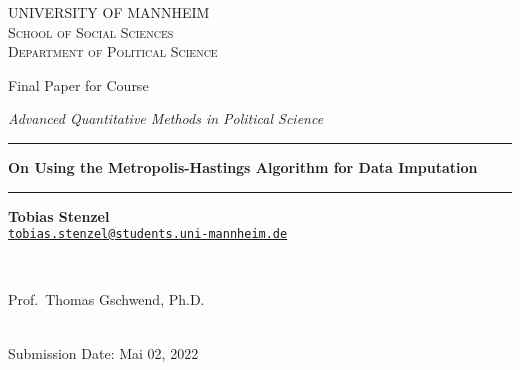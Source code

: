 \documentclass[12pt,english,a4paper,oneside]{article}
\theoremstyle{definition}
\theoremstyle{definition}
\theoremstyle{definition}
\theoremstyle{definition}
\theoremstyle{remark}
\begin{document}
\begin{titlepage}

    \begin{center}
    \large{ \textsc{ \uppercase{University of Mannheim} \\ \vspace{-0.2cm}
School of Social Sciences \\ \vspace{-0.2cm}
Department of Political Science}}

      
        \vspace{3.5cm}
        

       \large{   Final Paper for Course   }


       \large{ \textit{   Advanced Quantitative Methods in Political Science   }}

\renewcommand{\linethickness}{0.03em}
\rule{\linewidth}{\linethickness}


       \LARGE{ \textbf{   On Using the Metropolis-Hastings Algorithm for Data Imputation   }}


       \large{  }

        \vspace{-0.2cm}
\rule{\linewidth}{\linethickness}


\begin{minipage}[t]{0.5\textwidth}
\begin{flushleft}
\singlespacing
 \textbf{Tobias Stenzel}  \\ 


 \href{mailto:tobias.stenzel@students.uni-mannheim.de}{\nolinkurl{tobias.stenzel@students.uni-mannheim.de}}  \\ 

\end{flushleft}
\end{minipage}
\begin{minipage}[t]{0.4\textwidth}
\hfill
\end{minipage}\\
\vspace{0.2cm}
\begin{minipage}[t]{0.35\textwidth}
\hfill
\end{minipage}
\begin{minipage}[t]{0.55\textwidth}
\begin{flushright}
\singlespacing
     Prof.~Thomas Gschwend, Ph.D.  \\       

\end{flushright}
\end{minipage}\\
%


         \vfill
         Submission Date: Mai 02, 2022 \\ 
        





         \vfill



     \end{center}
    \thispagestyle{empty}
\end{titlepage}
\end{document}
